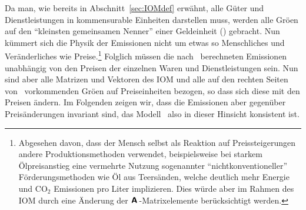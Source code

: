 Da man, wie bereits in Abschnitt~\ref{sec:IOMdef} erw\"ahnt, alle
G\"uter und Dienstleistungen in kommensurable Einheiten darstellen
muss, werden alle Gr\"o\3en auf den ``kleinsten gemeinsamen Nenner''
einer Geldeinheit (\eur) gebracht. Nun k\"ummert sich die Physik der
Emissionen nicht um etwas so Menschliches und Ver\"anderliches wie
Preise.\footnote{Abgesehen davon, dass der Mensch selbst als Reaktion
  auf Preissteigerungen andere Produktionsmethoden verwendet,
  beispielsweise bei starkem \"Olpreisanstieg eine vermehrte Nutzung sogenannter
  ``nichtkonventioneller'' F\"orderungsmethoden wie \"Ol aus
  Teers\"anden, welche deutlich mehr Energie und CO$_2$ Emissionen pro
  Liter implizieren. Dies w\"urde aber im Rahmen des IOM durch eine \"Anderung der
  $\textbf{\textsf{A}}\,$-Matrixelemente ber\"ucksichtigt werden.}
Folglich m\"ussen die nach~ berechneten Emissionen
unabh\"angig von den Preisen der einzelnen Waren und Dienstleistungen
sein. Nun sind aber alle Matrizen und Vektoren des IOM und alle auf
den rechten Seiten von~
 vorkommenden Gr\"o\3en auf
Preiseinheiten bezogen, so dass sich diese mit den Preisen
\"andern. Im Folgenden zeigen wir, dass die Emissionen aber
gegen\"uber Preis\"anderungen invariant sind, das
Modell~ also in dieser Hinsicht konsistent ist.

